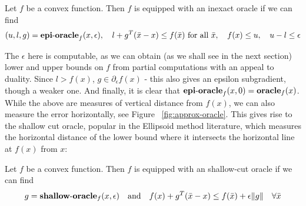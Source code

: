 \begin{defn} \label{def:epi-inexact-oracle} Let $f$ be a convex
function. Then $f$ is equipped with an inexact oracle if we can find
$$(u,l,g)=\mbox{{\bf epi}-{\bf oracle}}_f(x,\epsilon),\quad 
l+g^T(\bar{x}-x)\leq f(\bar{x}) \mbox{ for all }\bar{x}, \quad f(x) \leq u, \quad 
u-l\leq\epsilon
$$
\end{defn}

The $\epsilon$ here is computable, as we can obtain (as we shall see in the
next section) lower and upper bounds on $f$ from partial computations with an
appeal to duality. Since $l > f(x)$, $g \in \partial_\epsilon f(x)$ - this
also gives an epsilon subgradient, though a weaker one. And finally, it is
clear that $\mbox{{\bf epi}-{\bf oracle}}_f(x,0) = \mbox{\bf oracle}_f(x)$. While the above are measures of
vertical distance from $f(x)$, we can also measure the error horizontally, see
Figure ~\ref{fig:approx-oracle}. This gives rise to the shallow cut oracle,
popular in the Ellipsoid method \cite{bland1981ellipsoid} literature, which
measures  the horizontal distance of the lower bound where it intersects the
horizontal line at $f(x)$ from $x$:

\begin{defn} \label{def:shallow-cut-oracle} Let $f$ be a convex
function. Then $f$ is equipped with an shallow-cut oracle if we can find
   \begin{equation} \label{eq:SpO-Oracle}
     g = \mbox{{\bf shallow}-{\bf oracle}}_f (x,\epsilon ) 
     \quad \text{and}\quad  
     f(x)+g^T(\bar{x}-x)\leq f(\bar{x}) 
     + \epsilon\|g\| \quad 
     \forall \bar{x}
   \end{equation}
\end{defn}



